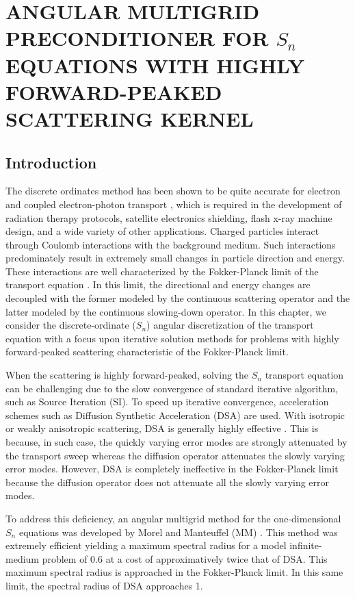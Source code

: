 \chapter{\uppercase{Angular Multigrid Preconditioner for $S_n$ equations with Highly
Forward-Peaked Scattering Kernel}} \label{anmg_chapter}
\section{Introduction}
The discrete ordinates method has been shown to be quite accurate for electron
and coupled electron-photon transport \cite{accuracy_2,morel_81,accuracy_1}, 
which is required in the development of radiation therapy protocols, satellite 
electronics shielding, flash x-ray machine design, and a wide variety of other 
applications. Charged particles interact through Coulomb interactions with the 
background medium. Such interactions predominately result in extremely small changes 
in particle direction and energy. These interactions are well characterized by the
Fokker-Planck limit of the transport equation \cite{fp_limit,morel_96}. In this 
limit, the directional and energy changes are decoupled with the former modeled 
by the continuous scattering operator and the latter modeled by the continuous 
slowing-down operator. In this chapter, we consider the discrete-ordinate ($S_n$) 
angular discretization of the transport equation with a focus upon iterative 
solution methods for problems with highly forward-peaked scattering characteristic 
of the Fokker-Planck limit. 

When the scattering is highly forward-peaked, solving the $S_n$ transport
equation can be challenging due to the slow convergence of standard iterative
algorithm, such as Source Iteration (SI). To speed up iterative convergence,
acceleration schemes such as Diffusion Synthetic Acceleration (DSA) are used.
With isotropic or weakly anisotropic scattering, DSA is generally highly
effective \cite{dsa_ref}. This is because, in such case, the quickly varying
error modes are strongly attenuated by the transport sweep whereas the
diffusion operator attenuates the slowly varying error modes. However, DSA is
completely ineffective in the Fokker-Planck limit \cite{multigrid_1d} because
the diffusion operator does not attenuate all the slowly varying error modes.

To address this deficiency, an  angular multigrid method for the
one-dimensional $S_n$
equations was developed by Morel and Manteuffel (MM) \cite{multigrid_1d}. This
method was extremely efficient yielding a maximum spectral radius for 
a model infinite-medium problem of 0.6 at a cost of
approximatively twice that of DSA. This maximum spectral radius is approached
in the Fokker-Planck limit. In this same limit, the spectral radius of DSA
approaches 1. 

